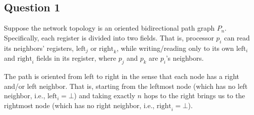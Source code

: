 \documentclass[12pt]{article}
\begin{document}
\subsection*{Question 1}


Suppose the network topology is an oriented bidirectional path graph $P_n$. 
Specifically, each register is divided into two fields. That is, processor $p_i$ can read
its neighbors’ registers, $\text{left}_j$ or $\text{right}_k$, while writing/reading only 
to its own $\text{left}_i$ and $\text{right}_i$ fields in its register, where $p_j$ and $p_k$ 
are $p_i$’s neighbors. 

The path is oriented from left to right in the sense that each node has a right and/or 
left neighbor. That is, starting from the leftmost node (which has no left neighbor, 
i.e., $\text{left}_i = \bot$) and taking exactly $n$ hops to the right brings us 
to the rightmost node (which has no right neighbor, i.e., $\text{right}_i = \bot$).


\bigskip
\end{document}
